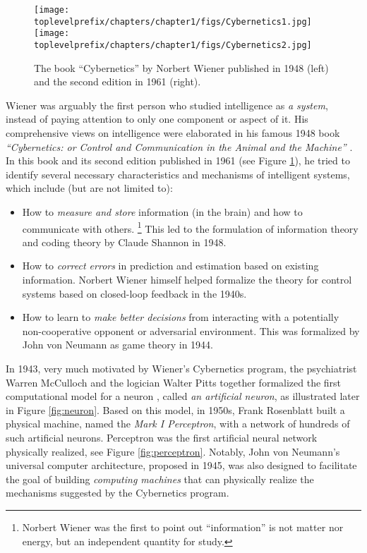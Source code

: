 \documentclass[../../book-main.tex]{subfiles}
\begin{document}
\begin{figure}
    \centering
    \texttt{[image: \\toplevelprefix/chapters/chapter1/figs/Cybernetics1.jpg]}
    \hspace{10mm} \texttt{[image: \\toplevelprefix/chapters/chapter1/figs/Cybernetics2.jpg]}
    \caption{The book ``Cybernetics'' by Norbert Wiener published in 1948 \cite{Wiener-Cybernetics-1948} (left) and the second edition in 1961 \cite{Wiener-Cybernetics-1961} (right).}
    \label{fig:cybernetcis}
\end{figure}


Wiener was arguably the first person who studied intelligence as {\em a system}, instead of paying attention to only one component or aspect of it. His comprehensive views on intelligence were elaborated in his famous 1948 book {\em ``Cybernetics: or Control and Communication in the Animal and the Machine''} \cite{Wiener-Cybernetics-1948}. In this book and its second edition published in 1961 \cite{Wiener-Cybernetics-1961} (see Figure \ref{fig:cybernetcis}), he tried to identify several necessary characteristics and mechanisms of intelligent systems, which include (but are not limited to):
\begin{itemize}
    \item How to {\em measure and store} information (in the brain) and how to communicate with others. \footnote{Norbert Wiener was the first to point out ``information'' is not matter nor energy, but an independent quantity for study.} This led to the formulation of information theory and coding theory by Claude Shannon in 1948.
    \item How to {\em correct errors}  in prediction and estimation based on existing information. Norbert Wiener himself helped formalize the theory for control systems based on closed-loop feedback in the 1940s. 
    \item How to learn to {\em make better decisions} from interacting with a potentially non-cooperative opponent or adversarial environment. This was formalized by John von Neumann as game theory in 1944. 
\end{itemize}
In 1943, very much motivated by Wiener's Cybernetics program, the psychiatrist Warren McCulloch and the logician Walter Pitts together formalized the first computational model for a neuron \cite{McCulloch-Pitts}, called {\em an artificial neuron}, as illustrated later in Figure \ref{fig:neuron}. Based on this model, in 1950s, Frank Rosenblatt built a physical machine, named the {\em Mark I Perceptron}, with a network of hundreds of such artificial neurons. Perceptron was the first artificial neural network physically realized, see Figure \ref{fig:perceptron}. Notably, John von Neumann's universal computer architecture, proposed in 1945, was also designed to facilitate the goal of building {\em computing machines} that can physically realize the mechanisms suggested by the Cybernetics program. 
\end{document}
